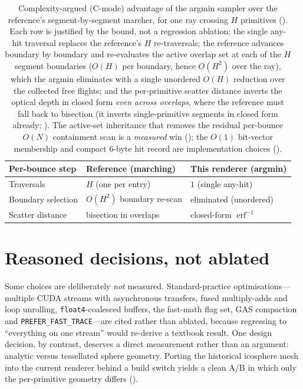 \begin{table}[htp]
  \centering
  \begin{tabular}{@{}lll@{}}
    \toprule
    Per-bounce step & Reference (marching) & This renderer (argmin) \\
    \midrule
    Traversals          & $H$ (one per entry)      & $1$ (single any-hit) \\
    Boundary selection  & $O(H^2)$ boundary re-scan & eliminated (unordered) \\
    Scatter distance    & bisection in overlaps    & closed-form $\operatorname{erf}^{-1}$ \\
    \bottomrule
  \end{tabular}
  \caption{Complexity-argued (C-mode) advantage of the argmin sampler over the reference's
  segment-by-segment marcher, for one ray crossing $H$ primitives (). Each row is
  justified by the bound, not a regression ablation: the single any-hit traversal replaces the reference's
  $H$ re-traversals; the reference advances boundary by boundary and re-evaluates the active overlap set at
  each of the $H$ segment boundaries ($O(H)$ per boundary, hence $O(H^2)$ over the ray), which the argmin
  eliminates with a single unordered $O(H)$ reduction over the collected free flights; and the per-primitive
  scatter distance
  inverts the optical depth in closed form \emph{even across overlaps}, where the reference must fall back
  to bisection (it inverts single-primitive segments in closed form already; ). The active-set inheritance that
  removes the residual per-bounce $O(N)$ containment scan is a \emph{measured} win (); the
  $O(1)$ bit-vector membership and compact $6$-byte hit record are implementation choices
  ().}
  \label{tab:complexity}
\end{table}

\section{Reasoned decisions, not ablated}
\label{sec:reasoned}

Some choices are deliberately \emph{not} measured. Standard-practice optimisations---multiple CUDA
streams with asynchronous transfers, fused multiply-adds and loop unrolling, \texttt{float4}-coalesced
buffers, the fast-math flag set, GAS compaction and \texttt{PREFER\_FAST\_TRACE}---are cited rather than
ablated, because regressing to ``everything on one stream'' would re-derive a textbook result. One
design decision, by contrast, deserves a direct measurement rather than an argument: analytic versus
tessellated sphere geometry. Porting the historical icosphere mesh into the current renderer behind a
build switch yields a clean A/B in which only the per-primitive geometry differs ().

